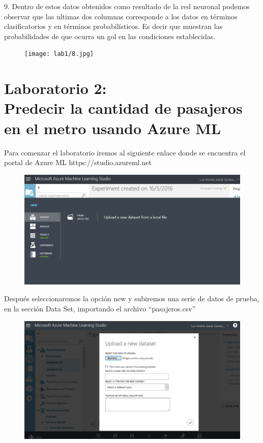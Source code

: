 \documentclass[11pt]{article}
\begin{document}
9. Dentro de estos datos obtenidos como resultado de la red neuronal podemos observar que las ultimas dos columnas corresponde a los datos en términos clasificatorios y en términos probabilísticos. Es decir que muestran las probabilidades de que ocurra un gol en las condiciones establecidas. 
\begin{figure}[htp]
\centering
\texttt{[image: lab1/8.jpg]}
\label{fig:lion}
\end{figure}

\newpage


\section {Laboratorio 2: \\  Predecir la cantidad de pasajeros en el metro usando Azure ML}


Para comenzar el laboratorio iremos al siguiente enlace donde se encuentra el portal de Azure ML 
https://studio.azureml.net\\

\begin{figure}[htp]
\centering
\includegraphics[width=12cm]{2.jpg}
\label{fig:lion}
\end{figure}

Después seleccionaremos la opción new y subiremos una serie de datos de prueba, en la sección Data Set, importando el archivo “pasajeros.csv” \\

\begin{figure}[htp]
\centering
\includegraphics[width=12cm]{3.jpg}
\label{fig:lion}
\end{figure}
\end{document}
